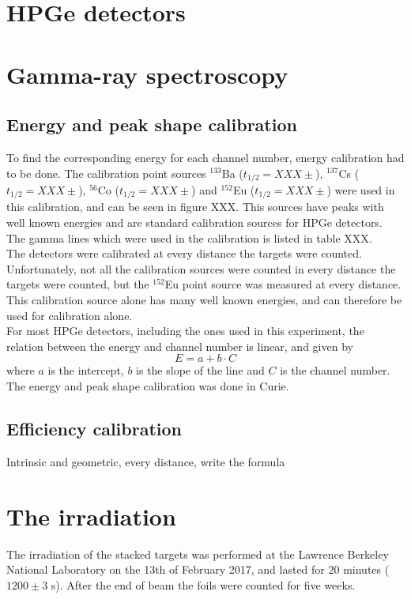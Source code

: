 \section{HPGe detectors}
\section{Gamma-ray spectroscopy}
\subsection{Energy and peak shape calibration}
To find the corresponding energy for each channel number, energy calibration had to be done. The calibration point sources $^{133}$Ba ($t_{1/2} = XXX \pm$), $^{137}$Cs ($t_{1/2} = XXX \pm $), $^{56}$Co ($t_{1/2} = XXX \pm $) and $^{152}$Eu ($t_{1/2} = XXX \pm$) were used in this calibration, and can be seen in figure XXX. This sources have peaks with well known energies and are standard calibration sources for HPGe detectors. The gamma lines which were used in the calibration is listed in table XXX. 
\vspace{3mm}
\\
The detectors were calibrated at every distance the targets were counted. Unfortunately, not all the calibration sources were counted in every distance the targets were counted, but the $^{152}$Eu point source was measured at every distance. This calibration source alone has many well known energies, and can therefore be used for calibration alone. 
\vspace{3mm}
\\
For most HPGe detectors, including the ones used in this experiment, the relation between the energy and channel number is linear, and given by
\begin{equation}
    E = a + b\cdot C
\end{equation}
where $a$ is the intercept, $b$ is the slope of the line and $C$ is the channel number. The energy and peak shape calibration was done in Curie. 

\subsection{Efficiency calibration}
Intrinsic and geometric, every distance, write the formula 




\section{The irradiation}
The irradiation of the stacked targets was performed at the Lawrence Berkeley National Laboratory  on the 13th of February 2017, and lasted for 20 minutes ($1200 \pm 3$ s).  After the end of beam the foils were counted for five weeks. 